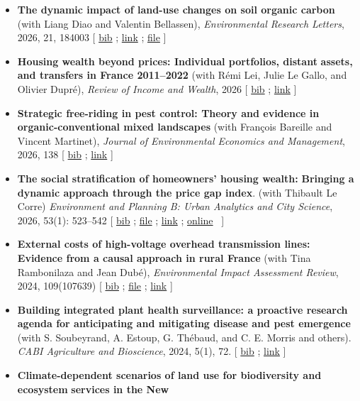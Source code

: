 \documentclass[12pt, a4paper]{./style}
\begin{document}
\begin{itemize}
\item \textbf{The dynamic impact of land-use changes on soil organic
carbon} (with Liang Diao and Valentin Bellassen),
\emph{Environmental Research Letters}, 2026, 21, 184003 [
\href{bib/SERENA.bib}{bib} ; \href{https://iopscience.iop.org/article/10.1088/1748-9326/ae9e50}{link} ; \href{doc/DSOIL-FILE.pdf}{file} ]
\item \textbf{Housing wealth beyond prices: Individual portfolios,
distant} \textbf{assets, and transfers in France 2011–2022}
(with Rémi Lei, Julie Le Gallo, and Olivier Dupré),
\emph{Review of Income and Wealth}, 2026 [ \href{bib/CH1R.bib}{bib} ; \href{https://onlinelibrary.wiley.com/doi/10.1111/roiw.70085}{link} ]
\item \textbf{Strategic free-riding in pest control: Theory and
evidence in organic-conventional mixed landscapes}
(with François Bareille and Vincent Martinet), \emph{Journal
of Environmental Economics and Management}, 2026, 138 [
\href{bib/FRD.bib}{bib} ; \href{https://www.sciencedirect.com/science/article/pii/S0095069626000665}{link} ]
\item \textbf{The social stratification of homeowners' housing
wealth:} \textbf{Bringing a dynamic approach through the price
gap index}. (with Thibault Le Corre) \emph{Environment and
Planning B: Urban Analytics and City Science}, 2026,
53(1): 523--542 [ \href{bib/PPL.bib}{bib} ; \href{doc/PPL-FILE.pdf}{file} ; \href{https://journals.sagepub.com/doi/10.1177/23998083251339296}{link} ; \href{https://github.com/jsay/PriceGapIndex}{online} ~]
\item \textbf{External costs of high-voltage overhead transmission lines:
Evidence from a causal approach in rural France} (with Tina
Rambonilaza and Jean Dubé), \emph{Environmental Impact Assessment
Review}, 2024, 109(107639) [ \href{bib/HVTOL.bib}{bib} ; \href{doc/HVTOL-FILE.pdf}{file} ; \href{https://www.sciencedirect.com/science/article/pii/S0195925524002269}{link} ]
\item \textbf{Building integrated plant health surveillance: a
proactive research} \textbf{agenda for anticipating and
mitigating disease and pest emergence} (with
S. Soubeyrand, A. Estoup, G. Thébaud, and C. E. Morris
and others). \emph{CABI Agriculture and Bioscience}, 2024,
5(1), 72. [ \href{bib/CABI.bib}{bib} ; \href{https://link.springer.com/article/10.1186/s43170-024-00273-8}{link} ]
\item \textbf{Climate-dependent scenarios of land use for
biodiversity and ecosystem} \textbf{services in the New
}
\end{itemize}
\end{document}
